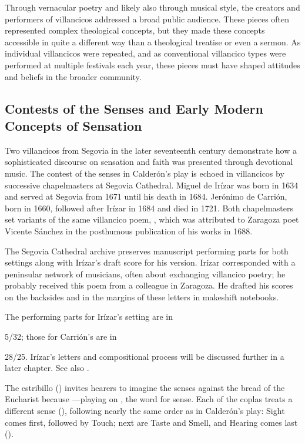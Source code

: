 Through vernacular poetry and likely also through musical style, the creators 
and performers of villancicos addressed a broad public audience.
These pieces often represented complex theological concepts, but they made 
these concepts accessible in quite a different way than a theological treatise 
or even a sermon.
As individual villancicos were repeated, and as conventional villancico types 
were performed at multiple festivals each year, these pieces must have shaped 
attitudes and beliefs in the broader community.


\subsection{Contests of the Senses and Early Modern Concepts of Sensation}

Two villancicos from Segovia in the later seventeenth century demonstrate how a 
sophisticated discourse on sensation and faith was presented through devotional 
music.
The contest of the senses in Calderón's play is echoed in villancicos by 
successive chapelmasters at Segovia Cathedral.
Miguel de Irízar was born in 1634 and served at Segovia from 1671 until his 
death in 1684.
Jerónimo de Carrión, born in 1660, followed after Irízar in 1684 and died in 
1721.%
    \Autocite{LopezCalo:Segovia}
Both chapelmasters set variants of the same villancico poem, , which was attributed to Zaragoza poet 
Vicente Sánchez in the posthumous publication of his works in 1688.%
    \Autocite{Sanchez:LiraPoetica}

The Segovia Cathedral archive preserves manuscript performing parts for both 
settings along with Irízar's draft score for his version.
Irízar corresponded with a peninsular network of musicians, often about 
exchanging villancico poetry; he probably received this poem from a colleague in
Zaragoza.  
He drafted his scores on the backsides and in the margins of these letters in
makeshift notebooks.%
\begin{Footnote}
    The performing parts for Irízar's setting are in \signature{E-SE}{5/32}; 
    those for Carrión's are in \signature{E-SE}{28/25}.
    Irízar's letters and compositional process will be discussed further in 
    a later chapter. %
    See also 
    \Autocites{LopezCalo:IrizarLetters1}{Olarte:Irizar}{Rodriguez:Networks}.
\end{Footnote}

The estribillo () invites 
hearers to imagine the senses  against the bread of 
the Eucharist because ---playing on , the word for sense.
Each of the coplas treats a different sense 
(), following nearly the same 
order as in Calderón's play: 
Sight comes first, followed by Touch; next are Taste and Smell, and Hearing 
comes last ().

